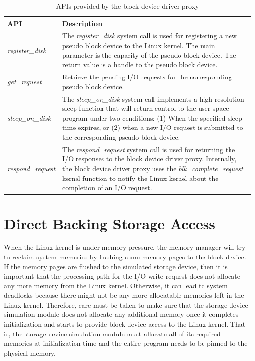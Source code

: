 \begin{table}[htpb]%
	\renewcommand{\arraystretch}{1.3}
	\centering
	\caption{APIs provided by the block device driver proxy}\label{tab:II}
	\noindent\begin{tabularx}{\textwidth}{|p{3.5cm}|X|}
	\hline
	\centering\bfseries API & \centering\bfseries\arraybackslash Description \\ \hline
	\textit{register_disk} & The \textit{register_disk} system call is used for registering a new pseudo block device to the Linux kernel. The main parameter is the capacity of the pseudo block device. The return value is a handle to the pseudo block device. \\ \hline
	
	\textit{get_request} & Retrieve the pending I/O requests for the corresponding pseudo block device. \\ \hline
	
	\textit{sleep_on_disk} & The \textit{sleep_on_disk} system call implements a high resolution sleep function that will return control to the user space program under two conditions: (1) When the specified sleep time expires, or (2) when a new I/O request is submitted to the corresponding pseudo block device. \\ \hline
	
	\textit{respond_request} & The \textit{respond_request} system call is used for returning the I/O responses to the block device driver proxy. Internally, the block device driver proxy uses the \textit{blk_complete_request} kernel function to notify the Linux kernel about the completion of an I/O request. \\ \hline
	\end{tabularx}
\end{table}


\section{Direct Backing Storage Access}
\label{sec:direct-backing-storage}

When the Linux kernel is under memory pressure, the memory manager will try to reclaim system memories by flushing some memory pages to the block device. If the memory pages are flushed to the simulated storage device, then it is important that the processing path for the I/O write request does not allocate any more memory from the Linux kernel. Otherwise, it can lead to system deadlocks because there might not be any more allocatable memories left in the Linux kernel. Therefore, care must be taken to make sure that the storage device simulation module does not allocate any additional memory once it completes initialization and starts to provide block device access to the Linux kernel. That is, the storage device simulation module must allocate all of its required memories at initialization time and the entire program needs to be pinned to the physical memory.

